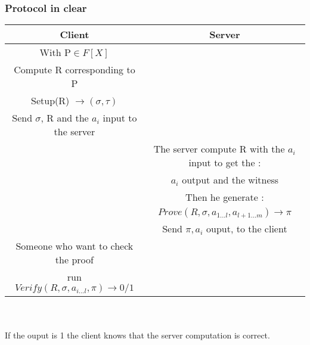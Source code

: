 \subsubsection{Protocol in clear}
\begin{tabular}{|c|c|}
  \hline
  \textbf{Client} & \textbf{Server} \TBstrut \\
  \hline
  With P$\in F[X]$ & \TBstrut \\
  Compute R corresponding to P & \TBstrut \\ 
  Setup(R) $\rightarrow (\sigma,\tau)$  & \TBstrut \\
  Send $\sigma$, R and the $a_i$ input to the server & \TBstrut \\
  \hline
     & The server compute R with the $a_i$ input to get the : \TBstrut \\ 
     & $ a_i$ output and the witness \TBstrut \\
     & Then he generate : \TBstrut \\
     & $Prove(R, \sigma, a_{1...l}, a_{l+1...m}) \rightarrow \pi$ \TBstrut \\
     & Send $\pi, a_i$ ouput, to the client \TBstrut \\
    \hline
    Someone who want to check the proof & \TBstrut \\ 
    run $Verify(R, \sigma, a_{i...l}, \pi) \rightarrow 0/1$ & \TBstrut \\
  \hline
\end{tabular}
\\
\\ If the ouput is 1 the client knows that the server computation is correct.
